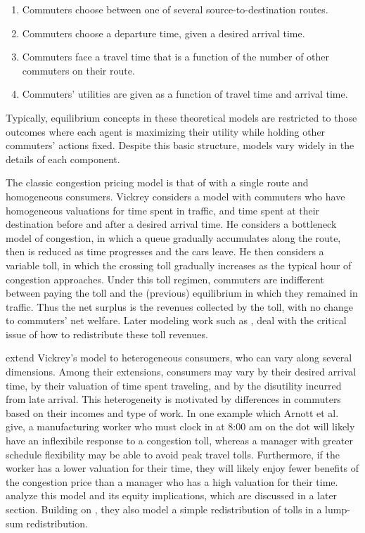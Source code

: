 \documentclass[JEL]{AEA}
\begin{document}
\begin{enumerate}
    \item Commuters choose between one of several source-to-destination routes.
    \item Commuters choose a departure time, given a desired arrival time.
    \item Commuters face a travel time that is a function of the number of other commuters on their route.
    \item Commuters' utilities are given as a function of travel time and arrival time.
\end{enumerate}

Typically, equilibrium concepts in these theoretical models are restricted to those outcomes where each agent is maximizing their utility while holding other commuters' actions fixed. Despite this basic structure, models vary widely in the details of each component. 

The classic congestion pricing model is that of \cite{vickrey-1969} with a single route and homogeneous consumers. Vickrey considers a model with commuters who have homogeneous valuations for time spent in traffic, and time spent at their destination before and after a desired arrival time. He considers a bottleneck model of congestion, in which a queue gradually accumulates along the route, then is reduced as time progresses and the cars leave. He then considers a variable toll, in which the crossing toll gradually increases as the typical hour of congestion approaches. Under this toll regimen, commuters are indifferent between paying the toll and the (previous) equilibrium in which they remained in traffic. Thus the net surplus is the revenues collected by the toll, with no change to commuters' net welfare. Later modeling work such as \cite{eliasson-2006}, deal with the critical issue of how to redistribute these toll revenues.

\cite{arnott-1994} extend Vickrey's model to heterogeneous consumers, who can vary along several dimensions. Among their extensions, consumers may vary by their desired arrival time, by their valuation of time spent traveling, and by the disutility incurred from late arrival. This heterogeneity is motivated by differences in commuters based on their incomes and type of work. In one example which Arnott et al. give, a manufacturing worker who must clock in at 8:00 am on the dot will likely have an inflexibile response to a congestion toll, whereas a manager with greater schedule flexibility may be able to avoid peak travel tolls. Furthermore, if the worker has a lower valuation for their time, they will likely enjoy fewer benefits of the congestion price than a manager who has a high valuation for their time. \cite{arnott-1994} analyze this model and its equity implications, which are discussed in a later section. Building on \cite{vickrey-1969}, they also model a simple redistribution of tolls in a lump-sum redistribution. 
\end{document}
